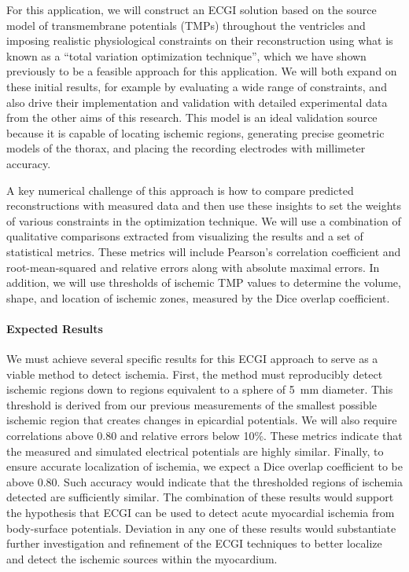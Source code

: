 For this application, we will construct an ECGI solution based on the
source model of transmembrane potentials (TMPs) throughout the ventricles
and imposing realistic physiological constraints on their reconstruction
using what is known as a ``total variation optimization technique'', which
we have shown previously to be a feasible approach for this
application. \cite{RSM:Wan2011b,RSM:Wan2013} We will both expand on these
initial results, for example by evaluating a wide range of constraints, and
also drive their implementation and validation with detailed experimental
data from the other aims of this research. This model is an ideal
validation source because it is capable of locating ischemic regions,
generating precise geometric models of the thorax, and placing the
recording electrodes with millimeter accuracy. 

A key numerical challenge of this approach is how to compare predicted
reconstructions with measured data and then use these insights to set the
weights of various constraints in the optimization technique.  We will use
a combination of qualitative comparisons extracted from visualizing the
results and a set of statistical metrics. These metrics will include
Pearson's correlation coefficient and root-mean-squared and relative errors
along with absolute maximal errors.  In addition, we will use thresholds of
ischemic TMP values to determine the volume, shape, and location of
ischemic zones, measured by the Dice overlap coefficient.

\paragraph{Expected Results} We must achieve several specific results for
this ECGI approach to serve as a viable method to detect ischemia. First,
the method must reproducibly detect ischemic regions down to regions
equivalent to a sphere of 5~mm diameter. This threshold is derived from our
previous measurements of the smallest possible ischemic region that creates
changes in epicardial potentials.  We will also require correlations above
0.80 and relative errors below 10\%. These metrics indicate that the
measured and simulated electrical potentials are highly similar. Finally,
to ensure accurate localization of ischemia, we expect a Dice overlap
coefficient to be above 0.80. Such accuracy would indicate that the
thresholded regions of ischemia detected are sufficiently similar. The
combination of these results would support the hypothesis that ECGI can be
used to detect acute myocardial ischemia from body-surface
potentials. Deviation in any one of these results would substantiate
further investigation and refinement of the ECGI techniques to better
localize and detect the ischemic sources within the myocardium.

